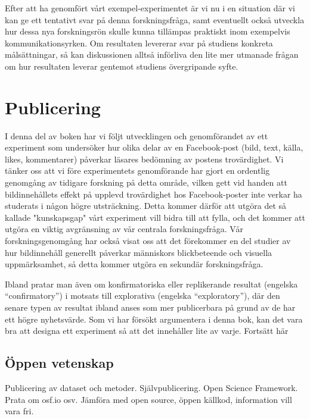 \documentclass[
]{book}
\begin{document}
Efter att ha genomfört vårt exempel-experimentet är vi nu i en situation där vi kan ge ett tentativt svar på denna forskningsfråga, samt eventuellt också utveckla hur dessa nya forskningsrön skulle kunna tillämpas praktiskt inom exempelvis kommunikationsyrken. Om resultaten levererar svar på studiens konkreta målsättningar, så kan diskussionen alltså införliva den lite mer utmanade frågan om hur resultaten leverar gentemot studiens övergripande syfte.

\hypertarget{sec08.3}{%
\section{Publicering}\label{sec08.3}}

I denna del av boken har vi följt utvecklingen och genomförandet av ett experiment som undersöker hur olika delar av en Facebook-post (bild, text, källa, likes, kommentarer) påverkar läsares bedömning av postens trovärdighet. Vi tänker oss att vi före experimentets genomförande har gjort en ordentlig genomgång av tidigare forskning på detta område, vilken gett vid handen att bildinnehållets effekt på upplevd trovärdighet hos Facebook-poster inte verkar ha studerats i någon högre utsträckning. Detta kommer därför att utgöra det så kallade "kunskapsgap" vårt experiment vill bidra till att fylla, och det kommer att utgöra en viktig avgränsning av vår centrala forskningsfråga. Vår forskningsgenomgång har också visat oss att det förekommer en del studier av hur bildinnehåll generellt påverkar människors blickbeteende och visuella uppmärksamhet, så detta kommer utgöra en sekundär forskningsfråga.

Ibland pratar man även om konfirmatoriska eller replikerande resultat (engelska ``confirmatory'') i motsats till explorativa (engelska ``exploratory''), där den senare typen av resultat ibland anses som mer publicerbara på grund av de har ett högre nyhetsvärde. Som vi har försökt argumentera i denna bok, kan det vara bra att designa ett experiment så att det innehåller lite av varje. Fortsätt här

\hypertarget{sub08.3.1}{%
\subsection{Öppen vetenskap}\label{sub08.3.1}}

Publicering av dataset och metoder. Självpublicering. Open Science Framework. Prata om osf.io osv. Jämföra med open source, öppen källkod, information vill vara fri.
\end{document}
